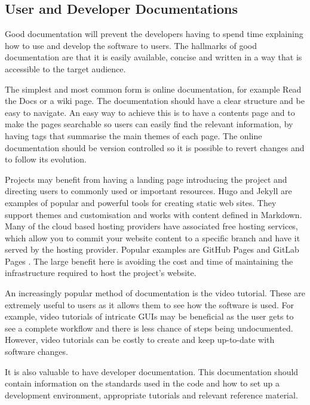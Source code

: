 \documentclass[jnr]{iosart2x}
\begin{document}
\subsection{User and Developer Documentations}
\label{Documentation}

Good documentation will prevent the developers having to spend time explaining how to use and develop the software to users.
The hallmarks of good documentation are that it is easily available, concise and written in a way that is accessible to the target audience.

The simplest and most common form is online documentation, for example Read the Docs \cite{Read_The_Docs} or a wiki page.
The documentation should have a clear structure and be easy to navigate.
An easy way to achieve this is to have a contents page and to make the pages searchable so users can easily find the relevant information, by having tags that summarise the main themes of each page.
The online documentation should be version controlled so it is possible to revert changes and to follow its evolution.

Projects may benefit from having a landing page introducing the project and directing users to commonly used or important resources.
Hugo \cite{Hugo} and Jekyll \cite{Jekyll} are examples of popular and powerful tools for creating static web sites.
They support themes and customisation and works with content defined in Markdown.
Many of the cloud based hosting providers have associated free hosting services, which allow you to commit your website content to a specific branch and have it served by the hosting provider.
Popular examples are GitHub Pages \cite{GitHub_Pages} and GitLab Pages \cite{GitLab_Pages}.
The large benefit here is avoiding the cost and time of maintaining the infrastructure required to host the project's website.

An increasingly popular method of documentation is the video tutorial.
These are extremely useful to users as it allows them to see how the software is used.
For example, video tutorials of intricate GUIs may be beneficial as the user gets to see a complete workflow and there is less chance of steps being undocumented.
However, video tutorials can be costly to create and keep up-to-date with software changes.

It is also valuable to have developer documentation.
This documentation should contain information on the standards used in the code and how to set up a development environment, appropriate tutorials and relevant reference material.
\end{document}
